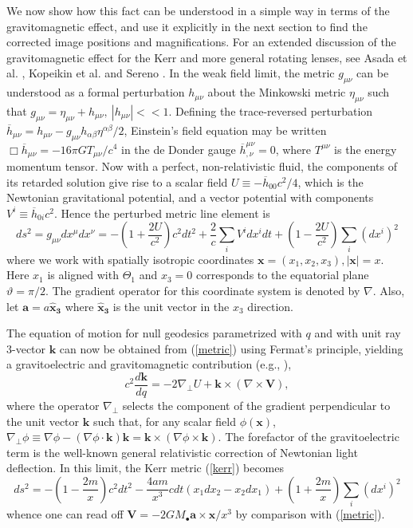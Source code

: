 \documentclass[prd,12pt,a4paper,showpacs]{revtex4}
\def\t{\Theta}
\def\to{\t_1}
\begin{document}
We now show how this fact can be understood in a simple way in terms of the gravitomagnetic effect, and use 
it explicitly in the next section to find the corrected image positions and magnifications. 
For an extended discussion of the gravitomagnetic effect for the Kerr and more general rotating lenses, 
see Asada et al. \cite{asada, asada2}, Kopeikin et al. \cite{kopeikin} and Sereno \cite{sereno3}. In the weak field limit, 
the metric $g_{\mu\nu}$ can be understood as a formal perturbation 
$h_{\mu\nu}$ about the Minkowski metric $\eta_{\mu\nu}$ such that 
$g_{\mu\nu}=\eta_{\mu\nu}+h_{\mu\nu}, \ |h_{\mu\nu}|<<1$. Defining the trace-reversed perturbation 
$\overline{h}_{\mu\nu}=h_{\mu\nu}-g_{\mu\nu}h_{\alpha\beta}\eta^{\alpha\beta}/2$, 
Einstein's field equation may be written $\Box \overline{h}_{\mu\nu}
=-16\pi GT_{\mu\nu}/c^4$ in the de Donder gauge 
$\overline{h}^{\mu\nu}_{,\nu}=0$, where $T^{\mu\nu}$ is the energy momentum tensor. 
Now with a perfect, non-relativistic fluid, the components of its 
retarded solution give rise to a scalar field $U\equiv-\overline{h}_{00}c^2/4$, 
which is the Newtonian gravitational potential, and a vector potential with 
components $V^i\equiv\overline{h}_{0i}c^2$. 
Hence the perturbed metric line element is
\begin{equation}
ds^2=g_{\mu\nu}dx^\mu dx^\nu=-\left(1+ \frac{2U}{c^2} \right) c^2dt^2+\frac{2}{c}\sum_i V^i dx^i dt +\left( 1-\frac{2U}{c^2} \right)\sum_i(dx^i)^2 
\label{metric}
\end{equation}
where we work with spatially isotropic coordinates 
$\mathbf{x}=(x_1,x_2,x_3),|\mathbf{x}|=x$. Here $x_1$ is 
aligned with $\to$ and $x_3=0$ corresponds to the equatorial plane $\vartheta=\pi/2$. 
The gradient operator for this coordinate system is denoted by $\nabla$. Also, let $\mathbf{a}=a\mathbf{\hat{x}_3}$ where $\mathbf{\hat{x}_3}$ is the unit vector in the $x_3$ direction.

The equation of motion for null geodesics parametrized with $q$ and with 
unit ray 3-vector $\mathbf{k}$ can now be obtained from (\ref{metric}) 
using Fermat's principle, yielding a gravitoelectric and 
gravitomagnetic contribution (e.g., \cite{asada2}),
\begin{equation}
c^2\frac{d\mathbf{k}}{dq}=-2\nabla_\perp U+\mathbf{k}\times(\nabla \times \mathbf{V}),
\label{motion}
\end{equation}
where the operator $\nabla_\perp$ selects the component of the gradient perpendicular to the unit vector $\mathbf{k}$ such that, 
for any scalar field $\phi(\mathbf{x})$, $\nabla_\perp\phi\equiv\nabla\phi-(\nabla\phi\cdot\mathbf{k})\mathbf{k}=\mathbf{k}\times(\nabla\phi\times\mathbf{k})$. 
The forefactor of the gravitoelectric term is the well-known general 
relativistic correction of Newtonian light deflection. In this limit, the Kerr metric (\ref{kerr}) becomes
\begin{equation}
ds^2=-\left(1-\frac{2m}{x}\right)c^2dt^2-\frac{4am}{x^3}cdt(x_1dx_2-x_2dx_1)+\left(1+\frac{2m}{x}\right)\sum_i(dx^i)^2
\label{kerr2}
\end{equation}
whence one can read off $\mathbf{V}=-2GM_\bullet\mathbf{a}\times \mathbf{x}/x^3$ by 
comparison with (\ref{metric}).
\end{document}
